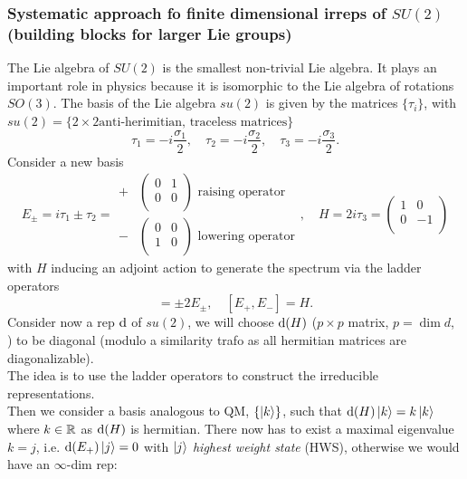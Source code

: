 \subsubsection{Systematic approach fo finite dimensional irreps of $SU(2)$ (building blocks for larger Lie groups)}
The Lie algebra of $SU (2)$ is the smallest non-trivial Lie algebra. It plays an important role in
physics because it is isomorphic to the Lie algebra of rotations $SO(3)$. The basis of the Lie algebra $su(2)$ is given by the matrices $\{\tau_i\}$, with $su(2)=\{2\times2 \text{anti-herimitian, traceless matrices} \}$
\begin{equation*}
\tau_1 = -i \frac{\sigma_1}{2}, \quad \tau_2= -i \frac{\sigma_2}{2},\quad \tau_3=-i\frac{\sigma_3}{2}.
\end{equation*}
Consider a new basis
\begin{equation*}
	E_\pm=i\tau_1\pm\tau_2=
	\begin{array}{ll}
		+&\begin{pmatrix}
		0&1\\
		0&0\\
	\end{pmatrix} \text{ raising operator } \\
- &
\begin{pmatrix}
	0&0\\
	1&0\\
\end{pmatrix}
\text{ lowering operator}
\end{array},\quad
H=2i\tau_3 = \begin{pmatrix}
	1 & 0\\
	0 &-1\\
\end{pmatrix}
\end{equation*}
with $H$ inducing an adjoint action to generate the spectrum via the ladder operators
\begin{equation*}
	[H,E_\pm] = \pm 2 E_\pm,\quad [E_+,E_-]=H.
\end{equation*}
Consider now a rep $\mathrm{d}$ of $su(2)$, we will choose $\mathrm{d}(H)$ ($p\times p$ matrix, $p=\dim d$, ) to be diagonal (modulo a similarity trafo as all hermitian matrices are diagonalizable). \\
The idea is to use the ladder operators to construct the irreducible representations.\\
Then we consider a basis analogous to QM, $\{\ket{k} \}$, such that $\mathrm{d} (H) \ket{k}=k\ket{k}$ where $k\in \mathbb{R}$ as $\mathrm{d} (H)$ is hermitian. There now has to exist a maximal eigenvalue $k=j$, i.e. $\mathrm{d}(E_+) \ket{j}=0$ with $\ket{j}$ \emph{highest weight state} (HWS), otherwise we would have an $\infty$-dim rep:
